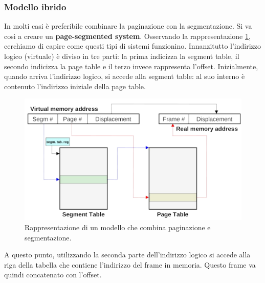 \subsubsection{Modello ibrido}
In molti casi è preferibile combinare la paginazione con la segmentazione. Si va così a creare un \textbf{page-segmented system}. Osservando la rappresentazione \ref{fig:page-segmented_system}, cerchiamo di capire come questi tipi di sistemi funzionino. Innanzitutto l'indirizzo logico (virtuale) è diviso in tre parti: la prima indicizza la segment table, il secondo indicizza la page table e il terzo invece rappresenta l'offset. Inizialmente, quando arriva l'indirizzo logico, si accede alla segment table: al suo interno è contenuto l'indirizzo iniziale della page table.
\begin{figure}[h]
    \centering
    \includegraphics[width = .7\textwidth]{../res/imgs/main memory/page-segmented_system.png}
    \caption{Rappresentazione di un modello che combina paginazione e segmentazione.}
    \label{fig:page-segmented_system}
\end{figure}
A questo punto, utilizzando la seconda parte dell'indirizzo logico si accede alla riga della tabella che contiene l'indirizzo del frame in memoria. Questo frame va quindi concatenato con l'offset.

